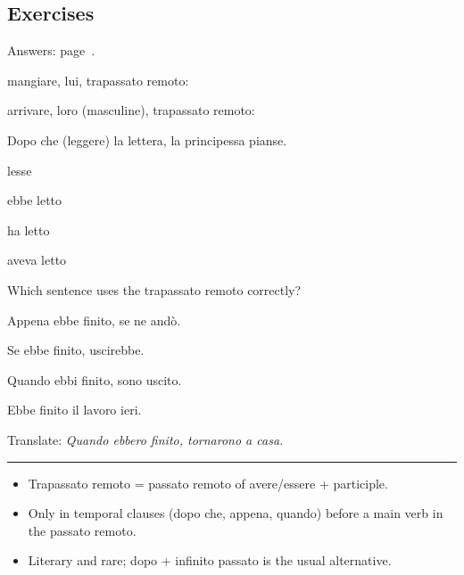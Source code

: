 \documentclass[11pt,a4paper,twoside,openright]{book}
\newcommand{\blank}{\underline{\hspace{2.6cm}}}
\newcommand{\answerline}{\par\vspace{6pt}\noindent\rule{0.75\linewidth}{0.4pt}\par}
\begin{document}
\subsection*{Exercises}\label{les:trapassato-remoto:exercises}
{\color{muted}\small Answers: page~\pageref{ans:trapassato-remoto}.}

\begin{exercises}
\item\label{ex:trapassato-remoto-1}\relax mangiare, lui, trapassato remoto: \blank{}
\item\label{ex:trapassato-remoto-2}\relax arrivare, loro (masculine), trapassato remoto: \blank{}
\item\label{ex:trapassato-remoto-3}\relax Dopo che \blank{} (leggere) la lettera, la principessa pianse.\par\nopagebreak\begin{options}
\item\relax lesse
\item\relax ebbe letto
\item\relax ha letto
\item\relax aveva letto
\end{options}
\item\label{ex:trapassato-remoto-4}\relax Which sentence uses the trapassato remoto correctly?\par\nopagebreak\begin{options}
\item\relax Appena ebbe finito, se ne andò.
\item\relax Se ebbe finito, uscirebbe.
\item\relax Quando ebbi finito, sono uscito.
\item\relax Ebbe finito il lavoro ieri.
\end{options}
\item\label{ex:trapassato-remoto-5}\relax Translate: \textit{Quando ebbero finito, tornarono a casa.}\par\answerline
\end{exercises}

\begin{summarybox}
\begin{itemize}
\item\relax Trapassato remoto = passato remoto of avere/essere + participle.
\item\relax Only in temporal clauses (dopo che, appena, quando) before a main verb in the passato remoto.
\item\relax Literary and rare; dopo + infinito passato is the usual alternative.
\end{itemize}
\end{summarybox}
\end{document}
